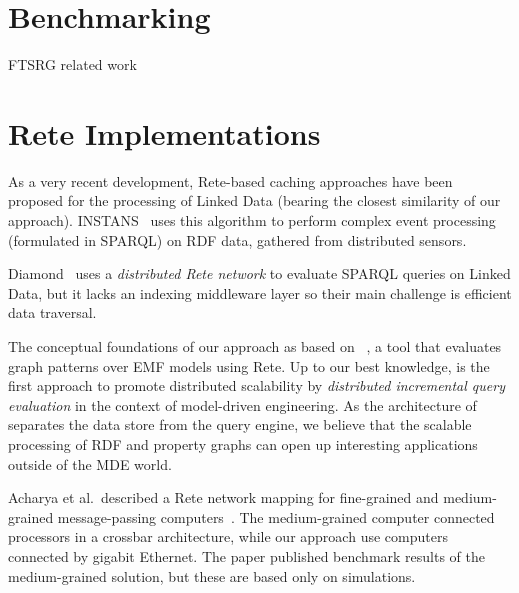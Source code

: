 \section{Benchmarking}

FTSRG related work


\cite{VSV05b}

\cite{STTT10}

\cite{ASE2013}



\section{Rete Implementations}


As a very recent development, Rete-based caching approaches have been proposed for the processing of Linked Data (bearing the closest similarity of our approach). \mbox{INSTANS}~\cite{INSTANS2012} uses this algorithm to perform complex event processing (formulated in SPARQL) on RDF data, gathered from distributed sensors.

Diamond~\cite{miranker2012diamond} uses a \emph{distributed Rete network} to evaluate SPARQL queries on Linked Data, but it lacks an indexing middleware layer so their main challenge is efficient data traversal.

The conceptual foundations of our approach as based on \eiq{}~\cite{models10}, a tool that evaluates graph patterns over EMF models using Rete. Up to our best knowledge, \iqd{} is the first approach to promote distributed scalability by \emph{distributed incremental query evaluation} in the context of model-driven engineering. As the architecture of \iqd{} separates the data store from the query engine, we believe that the scalable processing of RDF and property graphs can open up interesting applications outside of the MDE world.

Acharya et al.\ described a Rete network mapping for fine-grained and medium-grained message-passing computers~\cite{message-passing-rete}. The medium-grained computer connected processors in a crossbar architecture, while our approach use computers connected by gigabit Ethernet. The paper published benchmark results of the medium-grained solution, but these are based only on simulations.

